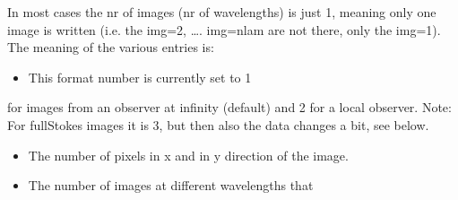 \documentclass[letterpaper,10pt,english]{sphinxmanual}
\begin{document}
In most cases the nr of images (nr of wavelengths) is just 1, meaning only
one image is written (i.e. the img=2, …. img=nlam are not there, only
the img=1). The meaning of the various entries is:
\begin{itemize}
\item {} 
 This format number is currently set to 1

\end{itemize}

for images from an observer at infinity (default) and 2 for a local observer.
Note: For full\sphinxhyphen{}Stokes images it is 3, but then also the data changes a
bit, see below.
\begin{itemize}
\item {} 
 The number of pixels in x and in y
direction of the image.

\item {} 
 The number of images at different wavelengths that

\end{itemize}
\end{document}
